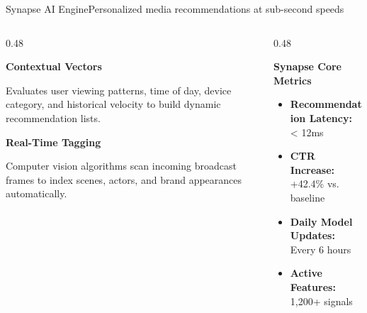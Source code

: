 \documentclass[aspectratio=169,11pt]{beamer}
\begin{document}
\begin{frame}{Synapse AI Engine}{Personalized media recommendations at sub-second speeds}
  \begin{columns}[T]
    \begin{column}{0.48\textwidth}
      \begin{tcolorbox}[keynotecard]
        {\bfseries\color{accentblue}\faDraftingCompass\quad Contextual Vectors} \par
        \vspace{4pt}
        {\tiny\color{textmuted} Evaluates user viewing patterns, time of day, device category, and historical velocity to build dynamic recommendation lists.}
      \end{tcolorbox}
      \vspace{4pt}
      \begin{tcolorbox}[keynotecard]
        {\bfseries\color{accentblue}\faLayerGroup\quad Real-Time Tagging} \par
        \vspace{4pt}
        {\tiny\color{textmuted} Computer vision algorithms scan incoming broadcast frames to index scenes, actors, and brand appearances automatically.}
      \end{tcolorbox}
    \end{column}
    
    \begin{column}{0.48\textwidth}
      \begin{tcolorbox}[darkcard]
        {\bfseries\color{accentcyan}\faTerminal\quad Synapse Core Metrics} \par
        \vspace{6pt}
        \begin{itemize}
          \setlength{\itemsep}{4pt}
          \item[{\color{accentcyan}\faAngleRight}] {\small\color{white}\textbf{Recommendation Latency:} < 12ms}
          \item[{\color{accentcyan}\faAngleRight}] {\small\color{white}\textbf{CTR Increase:} +42.4\% vs. baseline}
          \item[{\color{accentcyan}\faAngleRight}] {\small\color{white}\textbf{Daily Model Updates:} Every 6 hours}
          \item[{\color{accentcyan}\faAngleRight}] {\small\color{white}\textbf{Active Features:} 1,200+ signals}
        \end{itemize}
      \end{tcolorbox}
    \end{column}
  \end{columns}
\end{frame}
\end{document}
